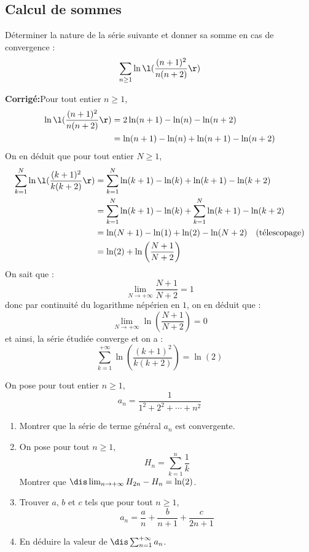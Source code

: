 \documentclass[a4paper,twoside,french,10pt]{VcCours}
\newcommand{\corr}{\textbf{Corrigé:}}
\begin{document}
\medskip

\subsection{Calcul de sommes}

\medskip

\begin{Exercice}{} Déterminer la nature de la série suivante et donner sa somme en cas de convergence : 
$$ \sum_{n \geq 1} \ln \l( \frac{(n+1)^2}{n(n+2)}\r)$$
\end{Exercice}

\corr Pour tout entier $n \geq 1$,
\begin{align*}
\ln \l( \frac{(n+1)^2}{n(n+2)}\r) & = 2\ln(n+1)- \ln(n)- \ln(n+2) \\
& = \ln(n+1)-\ln(n) + \ln(n+1)-\ln(n+2)
\end{align*}
On en déduit que pour tout entier $N \geq 1$,
\begin{align*}
\sum_{k=1}^N \ln \l( \frac{(k+1)^2}{k(k+2)}\r) &= \sum_{k=1}^N \ln(k+1)-\ln(k) + \ln(k+1)-\ln(k+2) \\
& = \sum_{k=1}^N \ln(k+1)-\ln(k) + \sum_{k=1}^N \ln(k+1)-\ln(k+2) \\
& = \ln(N+1) - \ln(1) + \ln(2)- \ln(N+2) \quad \hbox{(télescopage)} \\
& = \ln(2) + \ln \left( \dfrac{N+1}{N+2} \right)
\end{align*}
On sait que :
$$ \lim_{N \rightarrow + \infty} \dfrac{N+1}{N+2}=1$$
donc par continuité du logarithme népérien en $1$, on en déduit que :
$$ \lim_{N \rightarrow + \infty} \ln \left( \dfrac{N+1}{N+2} \right)=0$$
et ainsi, la série étudiée converge et on a :
$$ \sum_{k=1}^{+ \infty} \ln \left( \dfrac{(k+1)^2}{k(k+2)} \right) = \ln(2) $$


\medskip

\begin{Exercice}{} On pose pour tout entier $n \geq 1$,
$$ a_n = \dfrac{1}{1^2+2^2 + \cdots + n^2}$$
\begin{enumerate}
\item Montrer que la série de terme général $a_n$ est convergente.
\item On pose pour tout $n \geq 1$,
$$ H_n = \sum_{k=1}^n \dfrac{1}{k}$$
Montrer que $\dis \lim_{n \rightarrow + \infty} H_{2n}-H_n = \ln(2)$.
\item Trouver $a$, $b$ et $c$ tels que pour tout $n \geq 1$,
$$ a_n = \dfrac{a}{n} + \dfrac{b}{n+1} + \dfrac{c}{2n+1}$$
\item En déduire la valeur de $\dis \sum_{n=1}^{+ \infty} a_n$.
\end{enumerate}
\end{Exercice}
\end{document}
